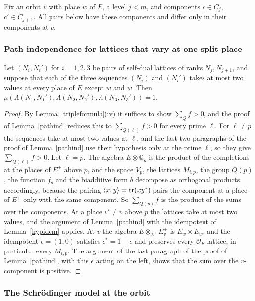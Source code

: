 Fix an orbit $v$ with place $w$ of $E$, a level $j<m$, and components $c\in C_j$, $c'\in C_{j+1}$. All pairs below have these components and differ only in their components at $v$.

\subsubsection{Path independence for lattices that vary at one split place}

\begin{lemma}\label{r1:lem:pathsplit}
Let $(N_i,N_i')$ for $i=1,2,3$ be pairs of self-dual lattices of ranks $N_j,N_{j+1}$, and suppose that each of the three sequences $(N_i)$ and $(N_i')$ takes at most two values at every place of $E$ except $w$ and $\bar w$. Then $\mu(\Lambda(N_1,N_1'),\Lambda(N_2,N_2'),\Lambda(N_3,N_3'))=1$.
\end{lemma}

\begin{proof}
By Lemma~\ref{tripleformula}(iv) it suffices to show $\sum_Qf>0$, and the proof of Lemma~\ref{pathind} reduces this to $\sum_{Q(\ell)}f>0$ for every prime $\ell$. For $\ell\ne p$ the sequences take at most two values at $\ell$, and the last two paragraphs of the proof of Lemma~\ref{pathind} use their hypothesis only at the prime $\ell$, so they give $\sum_{Q(\ell)}f>0$. Let $\ell=p$. The algebra $E\otimes\mathbb Q_p$ is the product of the completions at the places of $E^+$ above $p$, and the space $V_p$, the lattices $M_{i,p}$, the group $Q(p)$, the function $f_p$ and the biadditive form $b$ decompose as orthogonal products accordingly, because the pairing $\langle x,y\rangle=\operatorname{tr}(xy^\ast)$ pairs the component at a place of $E^+$ only with the same component. So $\sum_{Q(p)}f$ is the product of the sums over the components. At a place $v'\ne v$ above $p$ the lattices take at most two values, and the argument of Lemma~\ref{pathind} with the idempotent of Lemma~\ref{hypidem} applies. At $v$ the algebra $E\otimes_{E^+}E^+_v$ is $E_w\times E_{\bar w}$, and the idempotent $\epsilon=(1,0)$ satisfies $\epsilon^\ast=1-\epsilon$ and preserves every $\mathcal O_E$-lattice, in particular every $M_{i,p}$. The argument of the last paragraph of the proof of Lemma~\ref{pathind}, with this $\epsilon$ acting on the left, shows that the sum over the $v$-component is positive.
\end{proof}

\subsubsection{The Schr\"odinger model at the orbit}

